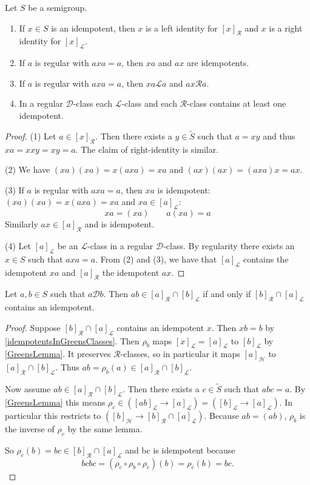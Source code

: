 \begin{proposition} \label{idempotentsInGreensClasses}
Let $S$ be a semigroup.
\begin{enumerate}
\item If $x\in S$ is an idempotent, then $x$ is a left identity for $[x]_{\mathcal{R}}$ and $x$ is a right identity for $[x]_{\mathcal{L}}$.
\item If $a$ is regular with $axa = a$, then $xa$ and $ax$ are idempotents.
\item If $a$ is regular with $axa = a$, then $xa\mathcal{L}a$ and $ax\mathcal{R}a$.
\item In a regular $\mathcal{D}$-class each $\mathcal{L}$-class and each $\mathcal{R}$-class contains at least one idempotent.
\end{enumerate}
\end{proposition}
\begin{proof}
(1) Let $a\in [x]_\mathcal{R}$. Then there exists a $y\in \widetilde{S}$ such that $a = xy$ and thus $xa = xxy = xy = a$. The claim of right-identity is similar.

(2) We have $(xa)(xa) = x(axa) = xa$ and $(ax)(ax) = (axa)x = ax$.

(3) If $a$ is regular with $axa = a$, then $xa$ is idempotent: $(xa)(xa) = x(axa) = xa$ and $xa \in [a]_{\mathcal{L}}$:
\[ xa = (xa) \qquad a(xa) = a \]
Similarly $ax \in [a]_{\mathcal{R}}$ and is idempotent.

(4) Let $[a]_\mathcal{L}$ be an $\mathcal{L}$-class in a regular $\mathcal{D}$-class. By regularity there exists an $x\in S$ such that $axa = a$. From (2) and (3), we have that $[a]_\mathcal{L}$ contains the idempotent $xa$ and $[a]_\mathcal{R}$ the idempotent $ax$.
\end{proof}

\begin{proposition}
Let $a,b \in S$ such that $a\mathcal{D}b$. Then $ab\in [a]_{\mathcal{R}}\cap [b]_{\mathcal{L}}$ \textup{if and only if} $[b]_{\mathcal{R}}\cap [a]_{\mathcal{L}}$ contains an idempotent.
\end{proposition}
\begin{proof}
Suppose $[b]_{\mathcal{R}}\cap [a]_{\mathcal{L}}$ contains an idempotent $x$. Then $xb = b$ by \ref{idempotentsInGreensClasses}. Then $\rho_b$ maps $[x]_{\mathcal{L}} = [a]_{\mathcal{L}}$ to $[b]_{\mathcal{L}}$ by \ref{GreensLemma}. It preserves $\mathcal{R}$-classes, so in particular it maps $[a]_{\mathcal{H}}$ to $[a]_{\mathcal{R}}\cap [b]_{\mathcal{L}}$. Thus $ab = \rho_b(a) \in [a]_{\mathcal{R}}\cap [b]_{\mathcal{L}}$.

Now assume $ab\in [a]_{\mathcal{R}}\cap [b]_{\mathcal{L}}$. Then there exists a $c\in \widetilde{S}$ such that $abc = a$. By \ref{GreensLemma} this means $\rho_c\in ([ab]_{\mathcal{L}}\to [a]_{\mathcal{L}}) = ([b]_{\mathcal{L}}\to [a]_{\mathcal{L}})$. In particular this restricts to $([b]_{\mathcal{H}}\to [b]_{\mathcal{R}}\cap[a]_{\mathcal{L}})$. Because $ab = (ab)$, $\rho_b$ is the inverse of $\rho_c$ by the same lemma.

So $\rho_c(b) = bc \in [b]_{\mathcal{R}}\cap[a]_{\mathcal{L}}$ and bc is idempotent because
\[ bcbc = (\rho_c\circ\rho_b\circ\rho_c) (b) = \rho_c(b) = bc. \]
\end{proof}

